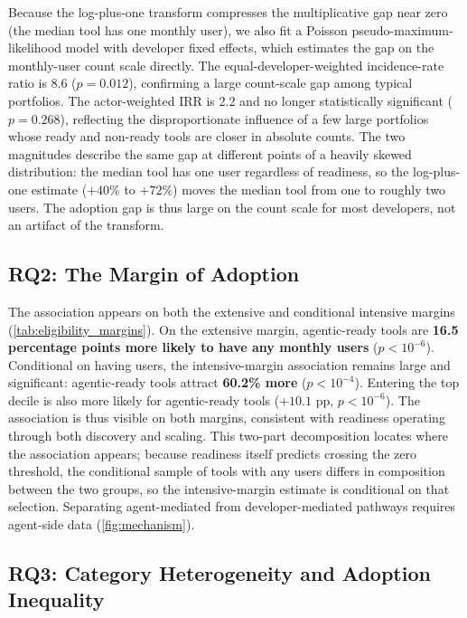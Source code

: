 Because the log-plus-one transform compresses the multiplicative gap near zero
(the median tool has one monthly user), we also fit a Poisson pseudo-maximum-
likelihood model with developer fixed effects, which estimates the gap on the
monthly-user count scale directly. The equal-developer-weighted incidence-rate
ratio is 8.6 ($p = 0.012$), confirming a large count-scale gap among typical
portfolios. The actor-weighted IRR is 2.2 and no longer
statistically significant ($p = 0.268$), reflecting the
disproportionate influence of a few large portfolios whose ready and non-ready
tools are closer in absolute counts. The two magnitudes
describe the same gap at different points of a heavily skewed distribution: the
median tool has one user regardless of readiness, so the log-plus-one estimate
($+40\%$ to $+72\%$) moves the median tool from one to roughly two users. The adoption gap is thus large on the
count scale for most developers, not an artifact of the transform.



\subsection{RQ2: The Margin of Adoption}
\label{sec:results:rq2}

The association appears on both the extensive and conditional intensive
margins (\autoref{tab:eligibility_margins}). On the extensive margin,
agentic-ready tools are \textbf{16.5 percentage points more likely to have any
monthly users} ($p < 10^{-6}$). Conditional on having users, the intensive-margin
association remains large and significant: agentic-ready tools attract
\textbf{60.2\% more} ($p < 10^{-4}$). Entering the top decile is also more
likely for agentic-ready tools ($+10.1$ pp, $p < 10^{-6}$). The association is
thus visible on both margins, consistent with readiness operating through both
discovery and scaling. This two-part decomposition locates where the association appears;
because readiness
itself predicts crossing the zero threshold, the conditional sample of tools
with any users differs in composition between the two groups, so the
intensive-margin estimate is conditional on that selection. Separating agent-mediated from
developer-mediated pathways requires agent-side data (\autoref{fig:mechanism}).



\subsection{RQ3: Category Heterogeneity and Adoption Inequality}
\label{sec:results:rq3}

